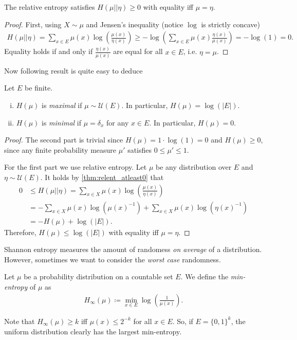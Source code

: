\begin{lemma} \label{thm:relent_atleast0}
    The relative entropy satisfies $H(\mu || \eta) \geq 0$ with equality iff $\mu = \eta$.
\end{lemma}
\begin{proof}
    First, using $X \sim \mu$ and Jensen's inequality (notice $\log$ is strictly concave)
    \begin{align*}
        H(\mu || \eta)  = \sum_{x \in E}\mu(x)\log\left(\frac{\mu(x)}{\eta(x)}\right) \geq -\log\left(\sum_{x \in E}\mu(x)\frac{\eta(x)}{\mu(x)}\right) = -\log(1) = 0.
    \end{align*}
    Equality holds if and only if $\frac{\eta(x)}{\mu(x)}$ are equal for all $x \in E$,
    i.e. $\eta = \mu$.
\end{proof}
Now following result is quite easy to deduce
\begin{theorem}
    Let $E$ be finite.
    \begin{enumerate}[(i)]
        \item $H(\mu)$ is \emph{maximal} if $\mu \sim \mathcal U(E)$. In particular, $H(\mu) = \log(|E|)$.
        \item $H(\mu)$ is \emph{minimal} if $\mu = \delta_x$ for any $x \in E$.
              In particular, $H(\mu) = 0$.
    \end{enumerate}
\end{theorem}
\begin{proof}
    The second part is trivial since $H(\mu) = 1 \cdot \log(1) = 0$ and $H(\mu) \geq 0$, since
    any finite probability measure $\mu'$ satisfies $0 \leq \mu' \leq 1$.

    For the first part we use relative entropy. Let $\mu$ be any distribution over $E$
    and $\eta \sim \mathcal U(E)$.
    It holds by \autoref{thm:relent_atleast0} that
    \begin{align*}
        0 & \leq H(\mu || \eta) = \sum_{x \in X} \mu(x) \log\left(\frac{\mu(x)}{\eta(x)}\right)   \\
          & = -\sum_{x \in X}\mu(x) \log (\mu(x)^{-1}) + \sum_{x \in X} \mu(x) \log(\eta(x)^{-1}) \\
          & = -H(\mu) + \log(|E|).
    \end{align*}
    Therefore, $H(\mu) \leq \log(|E|)$ with equality iff $\mu = \eta$.
\end{proof}

Shannon entropy measures the amount of randomess \emph{on average} of a distribution.
However, sometimes we want to consider the \emph{worst case} randomness.
\begin{definition}
    Let $\mu$ be a probability distribution on a countable set $E$.
    We define the \emph{min-entropy} of $\mu$ as
    \begin{align*}
        H_\infty(\mu) \coloneqq \min_{x \in E}\log\left(\frac{1}{\mu(x)}\right).
    \end{align*}
\end{definition}
Note that $H_\infty(\mu) \geq k$ iff $\mu(x) \leq 2^{-k}$ for all $x\in E$.
So, if $E = \{0,1\}^k$, the uniform distribution clearly has the largest min-entropy.

